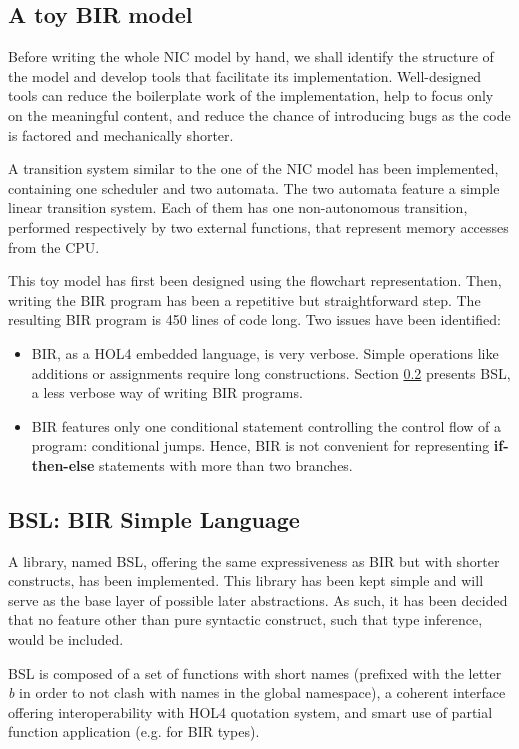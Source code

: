 \documentclass[10pt,a4paper]{article}
\begin{document}
\begin{multicols}{2}
\subsection{A toy BIR model} \label{alice-bob-toy}

Before writing the whole NIC model by hand, we shall identify the structure of the model and develop tools that facilitate its implementation. Well-designed tools can reduce the boilerplate work of the implementation, help to focus only on the meaningful content, and reduce the chance of introducing bugs as the code is factored and mechanically shorter.

A transition system similar to the one of the NIC model has been implemented, containing one scheduler and two automata. The two automata feature a simple linear transition system. Each of them has one non-autonomous transition, performed respectively by two external functions, that represent memory accesses from the CPU.

This toy model has first been designed using the flowchart representation. Then, writing the BIR program has been a repetitive but straightforward step. The resulting BIR program is \num{450} lines of code long. Two issues have been identified:

\begin{itemize}
    \item BIR, as a HOL4 embedded language, is very verbose. Simple operations like additions or assignments require long constructions. Section \ref{bsl} presents BSL, a less verbose way of writing BIR programs.
    \item BIR features only one conditional statement controlling the control flow of a program: conditional jumps. Hence, BIR is not convenient for representing \textbf{if-then-else} statements with more than two branches.
\end{itemize}

\subsection{BSL: BIR Simple Language} \label{bsl}

A library, named BSL, offering the same expressiveness as BIR but with shorter constructs, has been implemented. This library has been kept simple and will serve as the base layer of possible later abstractions. As such, it has been decided that no feature other than pure syntactic construct, such that type inference, would be included.

BSL is composed of a set of functions with short names (prefixed with the letter \textit{b} in order to not clash with names in the global namespace), a coherent interface offering interoperability with HOL4 quotation system, and smart use of partial function application (e.g. for BIR types).


\end{multicols}
\end{document}
